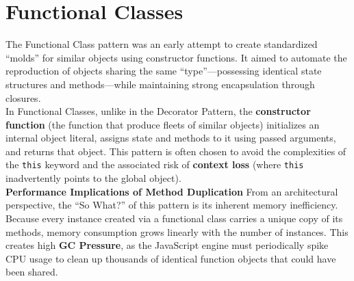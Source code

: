 \documentclass{scrbook}
\begin{document}
\section{Functional Classes}

The Functional Class pattern was an early attempt to create standardized ``molds'' for similar objects using constructor functions. It aimed to automate the reproduction of objects sharing the same ``type''---possessing identical state structures and methods---while maintaining strong encapsulation through closures.\\

In Functional Classes, unlike in the Decorator Pattern, the \textbf{constructor function} (the function that produce fleets of similar objects) initializes an internal object literal, assigns state and methods to it using passed arguments, and returns that object. This pattern is often chosen to avoid the complexities of the \texttt{this} keyword and the associated risk of \textbf{context loss} (where \texttt{this} inadvertently points to the global object).\\

\textbf{Performance Implications of Method Duplication} From an architectural perspective, the ``So What?'' of this pattern is its inherent memory inefficiency. Because every instance created via a functional class carries a unique copy of its methods, memory consumption grows linearly with the number of instances. This creates high \textbf{GC Pressure}, as the JavaScript engine must periodically spike CPU usage to clean up thousands of identical function objects that could have been shared.
\end{document}
